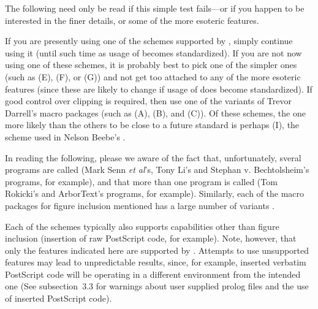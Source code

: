 The following need only be read if this simple test fails---or 
if you %
happen to be interested in the finer details,
or some of the more esoteric features.

If you are presently using one of the schemes supported by {\DVIPSONE}, 
simply continue using it
(until such time as usage of \verb@\special@ becomes standardized). 
If you are not now using one of these schemes, 
it is probably best to pick one of the simpler ones
(such as (E), (F), or (G)) %
and not get too attached to any of the more esoteric features
(since these are likely to change if %
usage of \verb@\special@ does become standardized).
If good control over clipping is required, then use one of the variants
of Trevor Darrell's {\PSFIG} macro packages (such as (A), (B), and (C)).
Of these schemes, the one more likely than the others to be close to a
future standard is perhaps (I), the scheme used in Nelson Beebe's {\DVIALW}. 

In reading the following, please we aware of the fact that,
unfortunately, sveral programs are called {\DVITWOPS} 
(Mark Senn {\it et al}'s, Tony Li's and Stephan v. Bechtolsheim's programs, 
for example),
and that more than one program is called {\DVIPS}
(Tom Rokicki's and ArborText's programs, for example).
Similarly, each of the %
macro packages for figure inclusion
mentioned has a large number of variants%
.

Each of the schemes typically also supports capabilities other than figure
inclusion (insertion of raw Post\-Script code, for example).
Note, however, that only the features indicated here are supported by
{\DVIPSONE}. 
Attempts to use unsupported features may lead to unpredictable results,
since, for example, inserted verbatim Post\-Script code will be
operating in a %
different environment from the intended one
(See subsection~3.3 for warnings about user supplied prolog files 
and the use of inserted Post\-Script code). 

